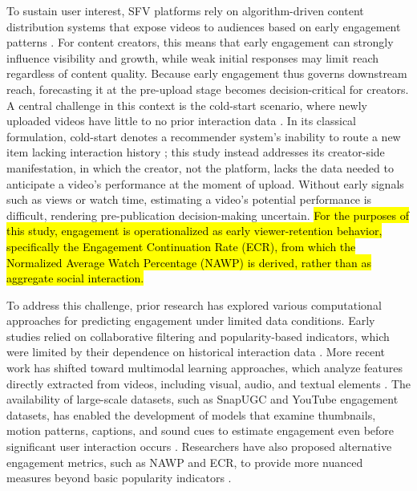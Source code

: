 To sustain user interest, SFV platforms rely on algorithm-driven content distribution systems that expose videos to audiences based on early engagement patterns \cite{covington2016deep}. For content creators, this means that early engagement can strongly influence visibility and growth, while weak initial responses may limit reach regardless of content quality. Because early engagement thus governs downstream reach, forecasting it at the pre-upload stage becomes decision-critical for creators. A central challenge in this context is the cold-start scenario, where newly uploaded videos have little to no prior interaction data \cite{li2024delving}. In its classical formulation, cold-start denotes a recommender system's inability to route a new item lacking interaction history \cite{lika2014facing}; this study instead addresses its creator-side manifestation, in which the creator, not the platform, lacks the data needed to anticipate a video's performance at the moment of upload. Without early signals such as views or watch time, estimating a video's potential performance is difficult, rendering pre-publication decision-making uncertain. \hl{For the purposes of this study, engagement is operationalized as early viewer-retention behavior, specifically the Engagement Continuation Rate (ECR), from which the Normalized Average Watch Percentage (NAWP) is derived, rather than as aggregate social interaction.}

To address this challenge, prior research has explored various computational approaches for predicting engagement under limited data conditions. Early studies relied on collaborative filtering and popularity-based indicators, which were limited by their dependence on historical interaction data \cite{he2017neural, zhou2010impact}. More recent work has shifted toward multimodal learning approaches, which analyze features directly extracted from videos, including visual, audio, and textual elements \cite{li2024delving, wu2018beyond}. The availability of large-scale datasets, such as SnapUGC and YouTube engagement datasets, has enabled the development of models that examine thumbnails, motion patterns, captions, and sound cues to estimate engagement even before significant user interaction occurs \cite{li2024delving, wu2018beyond}. Researchers have also proposed alternative engagement metrics, such as NAWP and ECR, to provide more nuanced measures beyond basic popularity indicators \cite{li2024delving}.

